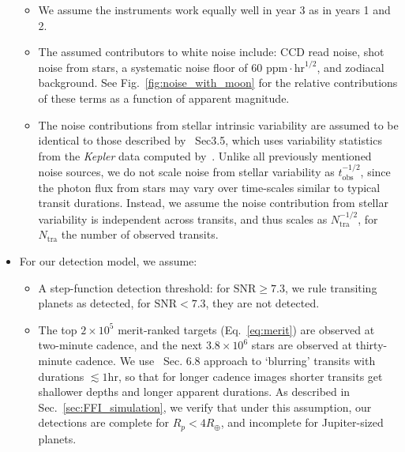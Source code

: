 \begin{itemize}
\begin{itemize}
	 \item We assume the instruments work equally well in year 3
           as in years 1 and 2.
           
	 \item The assumed contributors to white noise include: CCD
           read noise, shot noise from stars, a systematic noise floor
           of 60 $\mathrm{ppm}\cdot\mathrm{hr}^{1/2}$, and zodiacal
           background. See Fig.~\ref{fig:noise_with_moon} for the
           relative contributions of these terms as a function of
           apparent magnitude.
           
	\item The noise contributions from stellar intrinsic
          variability are assumed to be identical to those described
          by~ Sec3.5, which uses variability
          statistics from the \textit{Kepler} data computed
          by~\citet{basri_comparison_2013}.  Unlike all previously
          mentioned noise sources, we do not scale noise from stellar
          variability as $t_\mathrm{obs}^{-1/2}$, since the photon
          flux from stars may vary over time-scales similar to typical
          transit durations.  Instead, we assume the noise
          contribution from stellar variability is independent across
          transits, and thus scales as $N_\mathrm{tra}^{-1/2}$, for
          $N_\mathrm{tra}$ the number of observed transits.
	  \end{itemize}
          
	\item For our detection model, we assume:

	  \begin{itemize}

	  \item A step-function detection threshold: for $\mathrm{SNR}
            \geq 7.3$, we rule transiting planets as detected, for
            $\mathrm{SNR} < 7.3$, they are not detected.
            
	\item The top $2\times 10^5$ merit-ranked targets
          (Eq.~\ref{eq:merit}) are observed at two-minute cadence, and
          the next $3.8\times10^6$ stars are observed at thirty-minute
          cadence.  We use~ Sec. 6.8
          approach to `blurring' transits with durations $\lesssim
          1\mathrm{hr}$, so that for longer cadence images shorter
          transits get shallower depths and longer apparent durations.
          As described in Sec.~\ref{sec:FFI_simulation}, we verify
          that under this assumption, our detections are complete for
          $R_p<4R_\oplus$, and incomplete for Jupiter-sized planets.
                

\end{itemize}
\end{itemize}
